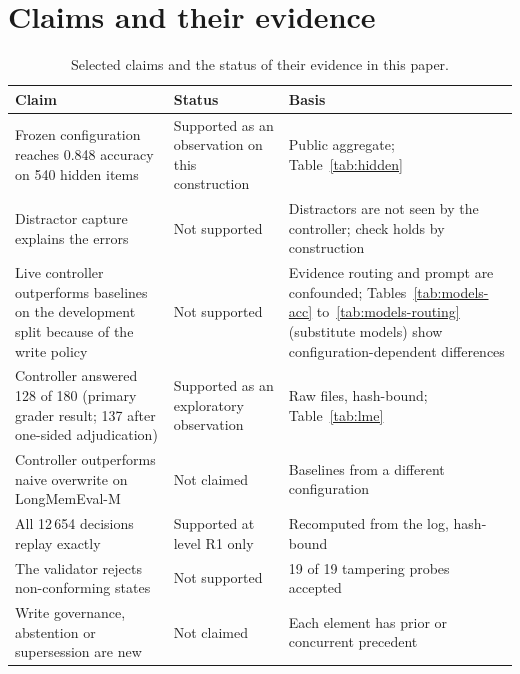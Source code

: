 \section{Claims and their evidence}
\label{app:claims}
\begin{table}[h]
\centering\small
\caption{Selected claims and the status of their evidence in this paper.}
\begin{tabular}{p{5.7cm}p{3.2cm}p{5.2cm}}
\toprule
Claim & Status & Basis \\
\midrule
Frozen configuration reaches 0.848 accuracy on 540 hidden items & Supported as an observation on this construction & Public aggregate; Table~\ref{tab:hidden} \\
Distractor capture explains the errors & Not supported & Distractors are not seen by the controller; check holds by construction \\
Live controller outperforms baselines on the development split because of the write policy & Not supported & Evidence routing and prompt are confounded; Tables~\ref{tab:models-acc} to~\ref{tab:models-routing} (substitute models) show configuration-dependent differences \\
Controller answered 128 of 180 (primary grader result; 137 after one-sided adjudication) & Supported as an exploratory observation & Raw files, hash-bound; Table~\ref{tab:lme} \\
Controller outperforms naive overwrite on LongMemEval-M & Not claimed & Baselines from a different configuration \\
All 12\,654 decisions replay exactly & Supported at level R1 only & Recomputed from the log, hash-bound \\
The validator rejects non-conforming states & Not supported & 19 of 19 tampering probes accepted \\
Write governance, abstention or supersession are new & Not claimed & Each element has prior or concurrent precedent \\
\bottomrule
\end{tabular}
\end{table}

